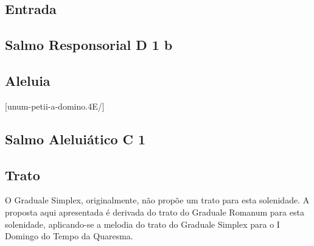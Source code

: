 \def\Prefix{proprium-sanctorum/sancti-ioseph-sponsi-bmv/}

\subsection{Entrada}\label{subsection:proprium-sanctorum/sancti-ioseph-sponsi-bmv/introitus}

\subsection{Salmo Responsorial \textmd{D 1 b}}\label{subsection:proprium-sanctorum/sancti-ioseph-sponsi-bmv/psalmus-responsorius}

\subsection{Aleluia}\label{subsection:proprium-sanctorum/sancti-ioseph-sponsi-bmv/alleluia}
[unum-petii-a-domino.4E/]

\AllowPageFlush

\subsection[Salmo Aleluiático]{Salmo Aleluiático \textmd{C 1}}\label{subsection:proprium-sanctorum/sancti-ioseph-sponsi-bmv/psalmus-alleluiaticus}

\AllowPageFlush

\subsection{Trato}\label{subsection:proprium-sanctorum/sancti-ioseph-sponsi-bmv/tractus}
\begin{rubrica}
  O Graduale Simplex, originalmente, não propõe um trato para esta solenidade. A proposta aqui apresentada é derivada do trato do Graduale Romanum para esta solenidade, aplicando-se a melodia do tra\-to do Graduale Simplex para o I Domingo do Tempo da Quaresma.
\end{rubrica}

